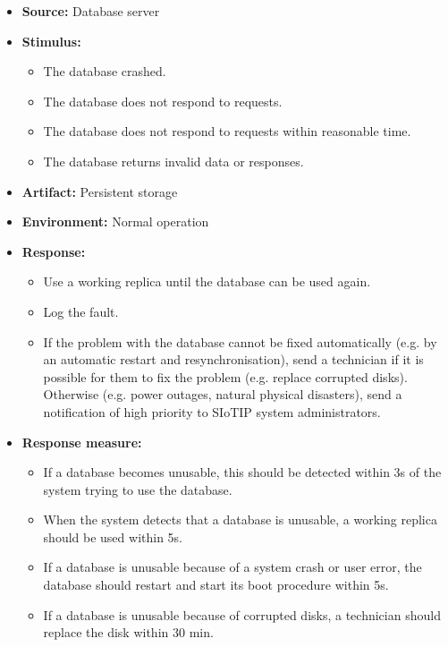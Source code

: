 \begin{itemize}
    \item \textbf{Source:} Database server
    \item \textbf{Stimulus:}
        \begin{itemize}
            \item The database crashed.
            \item The database does not respond to requests.
            \item The database does not respond to requests within reasonable time.
            \item The database returns invalid data or responses.
        \end{itemize}

    \item \textbf{Artifact:} Persistent storage
    \item \textbf{Environment:} Normal operation
    \item \textbf{Response:}
        \begin{itemize}
            \item Use a working replica until the database can be used again.
            \item Log the fault.
            \item If the problem with the database cannot be fixed automatically
                  (e.g. by an automatic restart and resynchronisation), send
                  a technician if it is possible for them to fix the problem
                  (e.g. replace corrupted disks). Otherwise (e.g. power outages,
                  natural physical disasters), send a notification
                  of high priority to SIoTIP system administrators.
        \end{itemize}

    \item \textbf{Response measure:}
        \begin{itemize}
            \item If a database becomes unusable, this should be detected
                  within 3s of the system trying to use the database.
            \item When the system detects that a database is unusable,
                  a working replica should be used within 5s.
            \item If a database is unusable because of a system crash or user error,
                  the database should restart and start its boot procedure within 5s.
            \item If a database is unusable because of corrupted disks, a technician
                  should replace the disk within 30 min.
        \end{itemize}
\end{itemize}

